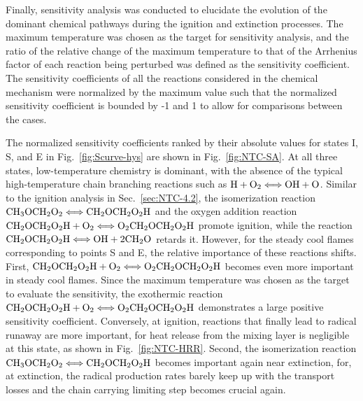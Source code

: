 Finally, sensitivity analysis was conducted to elucidate the evolution of the dominant chemical pathways during the ignition and extinction processes.  The maximum temperature was chosen as the target for sensitivity analysis, and the ratio of the relative change of the maximum temperature to that of the Arrhenius factor of each reaction being perturbed was defined as the sensitivity coefficient.  The sensitivity coefficients of all the reactions considered in the chemical mechanism were normalized by the maximum value such that the normalized sensitivity coefficient is bounded by -1 and 1 to allow for comparisons between the cases.

The normalized sensitivity coefficients ranked by their absolute values for states I, S, and E in Fig.~\ref{fig:Scurve-hys} are shown in Fig.~\ref{fig:NTC-SA}.  At all three states, low-temperature chemistry is dominant, with the absence of the typical high-temperature chain branching reactions such as $\rm{H} + \rm{O}_2 \Longleftrightarrow \rm{OH} + \rm{O}$.  Similar to the ignition analysis in Sec.~\ref{sec:NTC-4.2}, the isomerization reaction $\rm{CH}_3\rm{OCH}_2\rm{O}_2 \Longleftrightarrow \rm{CH}_2\rm{OCH}_2\rm{O}_2\rm{H}$ and the oxygen addition reaction $\rm{CH}_2\rm{OCH}_2\rm{O}_2\rm{H} + \rm{O}_2 \Longleftrightarrow \rm{O}_2\rm{CH}_2\rm{OCH}_2\rm{O}_2\rm{H}$ promote ignition, while the reaction $\rm{CH}_2\rm{OCH}_2\rm{O}_2\rm{H} \Longleftrightarrow \rm{OH} + 2\rm{CH}_2\rm{O}$ retards it.  However, for the steady cool flames corresponding to points S and E, the relative importance of these reactions shifts.  First, $\rm{CH}_2\rm{OCH}_2\rm{O}_2\rm{H} + \rm{O}_2 \Longleftrightarrow \rm{O}_2\rm{CH}_2\rm{OCH}_2\rm{O}_2\rm{H}$ becomes even more important in steady cool flames.  Since the maximum temperature was chosen as the target to evaluate the sensitivity, the exothermic reaction $\rm{CH}_2\rm{OCH}_2\rm{O}_2\rm{H} + \rm{O}_2 \Longleftrightarrow \rm{O}_2\rm{CH}_2\rm{OCH}_2\rm{O}_2\rm{H}$ demonstrates a large positive sensitivity coefficient.  Conversely, at ignition, reactions that finally lead to radical runaway are more important, for heat release from the mixing layer is negligible at this state, as shown in Fig.~\ref{fig:NTC-HRR}.  Second, the isomerization reaction $\rm{CH}_3\rm{OCH}_2\rm{O}_2 \Longleftrightarrow \rm{CH}_2\rm{OCH}_2\rm{O}_2\rm{H}$ becomes important again near extinction, for, at extinction, the radical production rates barely keep up with the transport losses and the chain carrying limiting step becomes crucial again.

